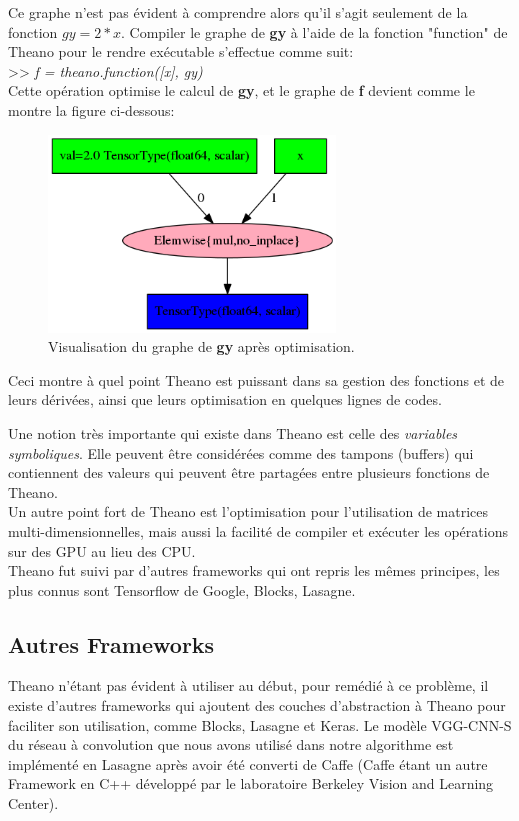 	Ce graphe n'est pas évident à comprendre alors qu'il s'agit seulement de la fonction $ gy = 2*x$. Compiler le graphe de \textbf{gy} à l'aide de la fonction "function" de Theano pour le rendre exécutable s'effectue comme suit:\\

>> \textit{f = theano.function([x], gy)}\\

	Cette opération optimise le calcul de \textbf{gy}, et le graphe de \textbf{f} devient comme le montre la figure ci-dessous:

\begin{figure}[H]
	\centering
		\includegraphics[width=3in]{Figures/afterOptimization.png}
	\caption[TheanoGraph]{Visualisation du graphe de \textbf{gy} après optimisation.}
	\label{fig:Electron}
\end{figure}

	Ceci montre à quel point Theano est puissant dans sa gestion des fonctions et de leurs dérivées, ainsi que leurs optimisation en quelques lignes de codes.
	
	Une notion très importante qui existe dans Theano est celle des \textit{variables symboliques}. Elle peuvent être considérées comme des tampons (buffers) qui contiennent des valeurs qui peuvent être partagées entre plusieurs fonctions de Theano.\\

	Un autre point fort de Theano est l'optimisation pour l'utilisation de matrices multi-dimensionnelles, mais aussi la facilité de compiler et exécuter les opérations sur des GPU au lieu des CPU.\\

	Theano fut suivi par d'autres frameworks qui ont repris les mêmes principes, les plus connus sont Tensorflow de Google, Blocks, Lasagne.

\subsection{Autres Frameworks}
	Theano n'étant pas évident à utiliser au début, pour remédié à ce problème, il existe d'autres frameworks qui ajoutent des couches d'abstraction à Theano pour faciliter son utilisation, comme Blocks, Lasagne et Keras.
	Le modèle VGG-CNN-S du réseau à convolution que nous avons utilisé dans notre algorithme est implémenté en Lasagne après avoir été converti de Caffe (Caffe étant un autre Framework en C++ développé par le laboratoire Berkeley Vision and Learning Center).\\

